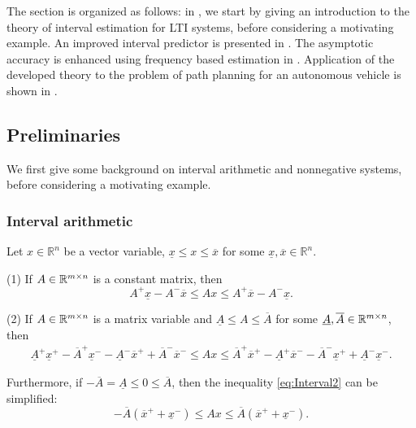 The section is organized as follows: in , we start by giving an introduction to the theory of interval estimation for \gls{LTI} systems, before considering a motivating example. An improved interval predictor is presented in . The asymptotic accuracy is enhanced using frequency based estimation in . Application of the developed theory to the problem of path planning for an autonomous vehicle is shown in .

\subsection{Preliminaries}
\label{sec:interval-preliminaries}

We first give some background on interval arithmetic and nonnegative systems, before considering a motivating example.

\subsubsection{Interval arithmetic}

\begin{lemma}
	\label{lem:interval}
	Let $x\in\mathbb{R}^{n}$ be a vector variable, $\underline{x}\le x\le\overline{x}$ for some $\underline{x},\overline{x}\in\mathbb{R}^{n}$. 
	
	\textup{(1)} If $A\in\mathbb{R}^{m\times n}$ is a constant matrix, then
	\begin{equation}
	A^{+}\underline{x}-A^{-}\overline{x}\le Ax\le A^{+}\overline{x}-A^{-}\underline{x}.\label{eq:Interval1}
	\end{equation}
	
	\textup{(2)} If $A\in\mathbb{R}^{m\times n}$ is a matrix variable and \textup{$\underline{A}\le A\le\overline{A}$} for some $\underline{A},\overline{A}\in\mathbb{R}^{m\times n}$, then
	\begin{gather}
	\underline{A}^{+}\underline{x}^{+}-\overline{A}^{+}\underline{x}^{-}-\underline{A}^{-}\overline{x}^{+}+\overline{A}^{-}\overline{x}^{-}\leq Ax\label{eq:Interval2}
	\leq\overline{A}^{+}\overline{x}^{+}-\underline{A}^{+}\overline{x}^{-}-\overline{A}^{-}\underline{x}^{+}+\underline{A}^{-}\underline{x}^{-}. 
	\end{gather}
\end{lemma}
Furthermore, if $-\overline{A}=\underline{A}\le0\le\overline{A}$, then the inequality \eqref{eq:Interval2} can be simplified: $$-\overline{A}(\overline{x}^{+}+\underline{x}^{-})\leq Ax\leq\overline{A}(\overline{x}^{+}+\underline{x}^{-}).$$

